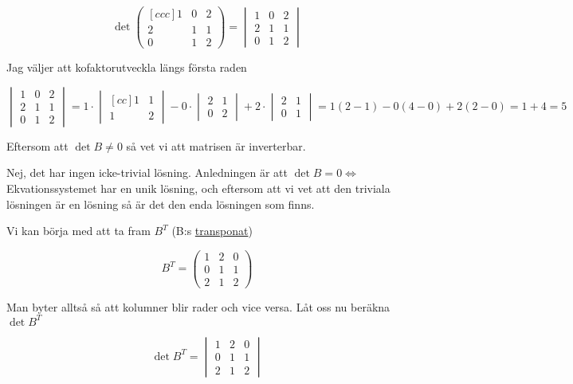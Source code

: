 \documentclass[../../main.tex]{subfiles}
\begin{document}
\begin{solution}{11}


$$
\det\begin{pmatrix}[ccc]
1&0&2\\
2&1&1\\
0&1&2
\end{pmatrix} 
=
\begin{vmatrix}
1&0&2\\
2&1&1\\
0&1&2
\end{vmatrix}
$$

Jag väljer att kofaktorutveckla längs första raden

$$
\begin{vmatrix}
1&0&2\\
2&1&1\\
0&1&2
\end{vmatrix}
= 1\cdot \begin{vmatrix}[cc]
1& 1\\ 
1&2
\end{vmatrix}
- 0\cdot \begin{vmatrix}
2 & 1\\
0&2
\end{vmatrix}
+ 2\cdot \begin{vmatrix}
2&1\\
0&1
\end{vmatrix}
= 1(2-1) - 0(4-0) + 2(2 - 0) = 1 + 4 = 5
$$

Eftersom att $\det B \neq 0$ så vet vi att matrisen är inverterbar.

Nej, det har ingen icke-trivial lösning. Anledningen är att $\det B = 0 \iff $ Ekvationssystemet har en unik lösning, och eftersom att vi vet att den triviala lösningen är en lösning så är det den enda lösningen som finns.

Vi kan börja med att ta fram $B^T$ (B:s \underline{transponat})

$$B^T = \begin{pmatrix}
1&2&0\\
0&1&1\\
2&1&2
\end{pmatrix}$$

Man byter alltså så att kolumner blir rader och vice versa. Låt oss nu beräkna $\det B^T$

$$
\det B^T = \begin{vmatrix}
1&2&0\\
0&1&1\\
2&1&2
\end{vmatrix}
$$


\end{solution}
\end{document}
